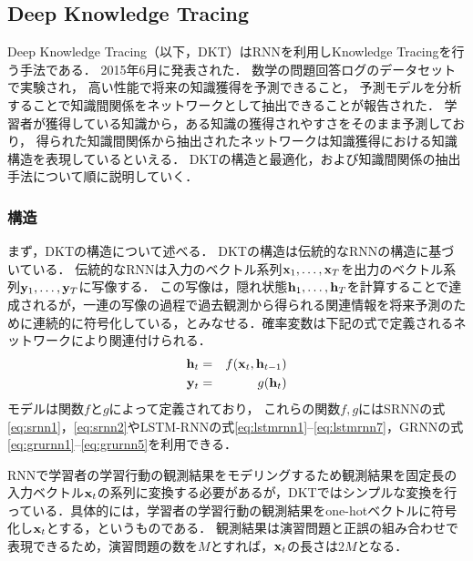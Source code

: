 \subsection{Deep Knowledge Tracing}
Deep Knowledge Tracing\cite{piech2015deep}（以下，DKT）はRNNを利用しKnowledge Tracingを行う手法である．
2015年6月に発表された．
数学の問題回答ログのデータセットで実験され，
高い性能で将来の知識獲得を予測できること，
予測モデルを分析することで知識間関係をネットワークとして抽出できることが報告された．
学習者が獲得している知識から，ある知識の獲得されやすさをそのまま予測しており，
得られた知識間関係から抽出されたネットワークは知識獲得における知識構造を表現しているといえる．
DKTの構造と最適化，および知識間関係の抽出手法について順に説明していく．



\subsubsection{構造}
まず，DKTの構造について述べる．
DKTの構造は伝統的なRNNの構造に基づいている．
伝統的なRNNは入力のベクトル系列${\bf x}_1, \dots, {\bf x}_T$を出力のベクトル系列${\bf y}_1, \dots, {\bf y}_T$に写像する．
この写像は，隠れ状態${\bf h}_1, \dots, {\bf h}_T$を計算することで達成されるが，一連の写像の過程で過去観測から得られる関連情報を将来予測のために連続的に符号化している，とみなせる．確率変数は下記の式で定義されるネットワークにより関連付けられる．
\begin{eqnarray}
\label{eq:rnn1}
{\bf h}_t &=& f({\bf x}_t, {\bf h}_{t-1})\\
\label{eq:rnn2}
{\bf y}_t &=& g({\bf h}_t)
\end{eqnarray}
モデルは関数$f$と$g$によって定義されており，
これらの関数$f, g$にはSRNNの式\ref{eq:srnn1}，\ref{eq:srnn2}やLSTM-RNNの式\ref{eq:lstmrnn1}--\ref{eq:lstmrnn7}，GRNNの式\ref{eq:grurnn1}--\ref{eq:grurnn5}を利用できる． 


RNNで学習者の学習行動の観測結果をモデリングするため観測結果を固定長の入力ベクトル${\bf x}_t$の系列に変換する必要があるが，DKTではシンプルな変換を行っている．具体的には，学習者の学習行動の観測結果をone-hotベクトルに符号化し${\bf x}_t$とする，というものである．
観測結果は演習問題と正誤の組み合わせで表現できるため，演習問題の数を$M$とすれば，${\bf x}_t$の長さは$2M$となる．


